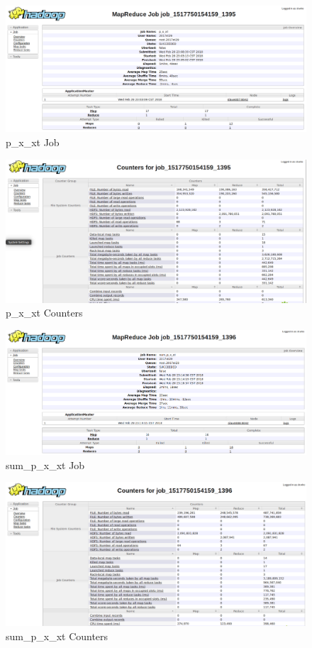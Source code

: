 \documentclass[a4paper,UTF8]{article}
\theoremstyle{definition}
\begin{document}
\begin{figure}[H]
	\centering
	\includegraphics[width=\textwidth]{pic/395_p_x_xt_job.png}
	\caption{p\_x\_xt Job}
\end{figure}
\begin{figure}[H]
	\centering
	\includegraphics[width=\textwidth]{pic/395_p_x_xt_counters.png}
	\caption{p\_x\_xt Counters}
\end{figure}

\begin{figure}[H]
	\centering
	\includegraphics[width=\textwidth]{pic/396_sum_p_x_xt_job.png}
	\caption{sum\_p\_x\_xt Job}
\end{figure}
\begin{figure}[H]
	\centering
	\includegraphics[width=\textwidth]{pic/396_sum_p_x_xt_counters.png}
	\caption{sum\_p\_x\_xt Counters}
\end{figure}
\end{document}
